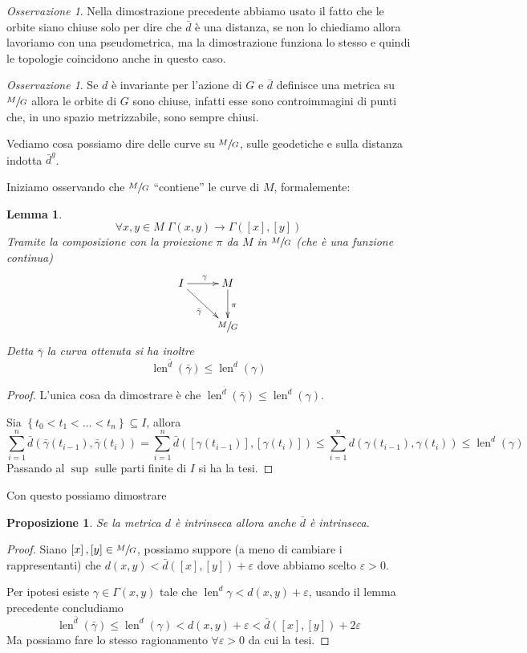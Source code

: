 \documentclass[a4paper,10pt]{article}
\newcounter{counter1}
\theoremstyle{plain}
\newtheorem{mylem}[counter1]{Lemma}
\newtheorem{mypro}[counter1]{Proposizione}
\theoremstyle{definition}
\theoremstyle{remark}
\newtheorem{myoss}[counter1]{Osservazione}
\newcommand{\set}[1]{\left\{#1\right\}}
\newcommand{\pa}[1]{\left(#1\right)}
\newcommand{\bra}[1]{\left[#1\right]}
\DeclareMathOperator{\len}{len}
\begin{document}
\begin{myoss}
  Nella dimostrazione precedente abbiamo usato il fatto che le orbite
  siano chiuse solo per dire che $\bar d$ è una distanza, se non lo
  chiediamo allora lavoriamo con una pseudometrica, ma la
  dimostrazione funziona lo stesso e quindi le topologie coincidono
  anche in questo caso.
\end{myoss}

\begin{myoss}
  Se $d$ è invariante per l'azione di $G$ e $\bar d$ definisce una
  metrica su $\sfrac{M}{G}$ allora le orbite di $G$ sono chiuse,
  infatti esse sono controimmagini di punti che, in uno spazio
  metrizzabile, sono sempre chiusi.
\end{myoss}

Vediamo cosa possiamo dire delle curve su $\sfrac{M}{G}$, sulle
geodetiche e sulla distanza indotta $\bar d ^g$.

Iniziamo osservando che $\sfrac{M}{G}$ ``contiene'' le curve di $M$,
formalemente:
\begin{mylem}
  \[ \forall x,y \in M \; \Gamma(x,y) \to \Gamma(\bra{x}, \bra{y}) \]
  Tramite la composizione con la proiezione $\pi$ da $M$ in
  $\sfrac{M}{G}$ (che è una funzione continua)
  \[ 
     \xymatrix{I \ar[r]^\gamma \ar[dr] _{\bar \gamma}& M \ar[d]^\pi \\
              & \sfrac{M}{G}  
            }
            \]
  Detta $\bar \gamma$ la curva ottenuta si ha inoltre
  \[ \len ^{\bar d} \pa{ \bar \gamma} \le \len ^d \pa{\gamma } \]
\end{mylem}
\begin{proof}
  L'unica cosa da dimostrare è che $\len ^{\bar d} \pa{ \bar \gamma}
  \le \len ^d \pa{\gamma }$.
  
  Sia $\set{ t_0 < t_1 < ... < t_n } \subseteq I$, allora
  \[ \sum _{i = 1} ^n \bar d ( \bar \gamma ( t_{i-1}) , \bar \gamma
  (t_i) ) = \sum _{i = 1} ^n \bar d ( \bra{\gamma ( t_{i-1}) } , \bra{
    \gamma (t_i)} ) \le \sum _{i = 1} ^n d ( \gamma ( t_{i-1}) ,
  \gamma (t_i) )  \le \len ^d (\gamma) \]
  Passando al $\sup$ sulle parti finite di $I$ si ha la tesi.
\end{proof}

Con questo possiamo dimostrare
\begin{mypro}
  Se la metrica $d$ è intrinseca allora anche $\bar d$ è intrinseca.
\end{mypro}
\begin{proof}
  Siano $\bra{x}, \bra{y} \in \sfrac{M}{G}$, possiamo suppore (a meno
  di cambiare i rappresentanti) che $d(x,y) < \bar d (\bra{x}, \bra{y}
  ) + \varepsilon$ dove abbiamo scelto $\varepsilon > 0$.

  Per ipotesi esiste $\gamma \in \Gamma( x,y)$ tale che $\len ^d
  \gamma < d(x,y) + \varepsilon$, usando il lemma precedente
  concludiamo
  \[ \len ^{\bar d} (\bar \gamma) \le \len ^d (\gamma) < d(x,y) +
  \varepsilon < \bar d (\bra{x}, \bra{y}) + 2\varepsilon \]
  Ma possiamo fare lo stesso ragionamento $\forall \varepsilon >0$ da
  cui la tesi.
\end{proof}
\end{document}
